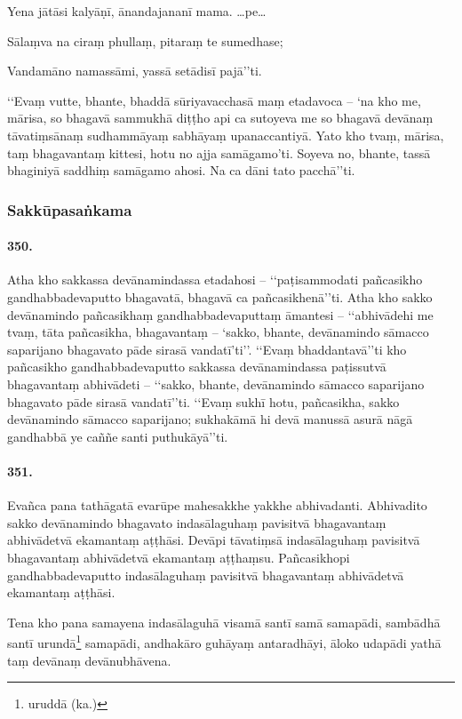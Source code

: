 Yena jātāsi kalyāṇī, ānandajananī mama. …pe…

Sālaṃva na ciraṃ phullaṃ, pitaraṃ te sumedhase;

Vandamāno namassāmi, yassā setādisī pajā’’ti.

‘‘Evaṃ vutte, bhante, bhaddā sūriyavacchasā maṃ etadavoca – ‘na kho me, mārisa, so bhagavā sammukhā diṭṭho api ca sutoyeva me so bhagavā devānaṃ tāvatiṃsānaṃ sudhammāyaṃ sabhāyaṃ upanaccantiyā. Yato kho tvaṃ, mārisa, taṃ bhagavantaṃ kittesi, hotu no ajja samāgamo’ti. Soyeva no, bhante, tassā bhaginiyā saddhiṃ samāgamo ahosi. Na ca dāni tato pacchā’’ti.

\subsubsection{Sakkūpasaṅkama}

\paragraph{350.} Atha kho sakkassa devānamindassa etadahosi – ‘‘paṭisammodati pañcasikho gandhabbadevaputto bhagavatā, bhagavā ca pañcasikhenā’’ti. Atha kho sakko devānamindo pañcasikhaṃ gandhabbadevaputtaṃ āmantesi – ‘‘abhivādehi me tvaṃ, tāta pañcasikha, bhagavantaṃ – ‘sakko, bhante, devānamindo sāmacco saparijano bhagavato pāde sirasā vandatī’ti’’. ‘‘Evaṃ bhaddantavā’’ti kho pañcasikho gandhabbadevaputto sakkassa devānamindassa paṭissutvā bhagavantaṃ abhivādeti – ‘‘sakko, bhante, devānamindo sāmacco saparijano bhagavato pāde sirasā vandatī’’ti. ‘‘Evaṃ sukhī hotu, pañcasikha, sakko devānamindo sāmacco saparijano; sukhakāmā hi devā manussā asurā nāgā gandhabbā ye caññe santi puthukāyā’’ti.

\paragraph{351.} Evañca pana tathāgatā evarūpe mahesakkhe yakkhe abhivadanti. Abhivadito sakko devānamindo bhagavato indasālaguhaṃ pavisitvā bhagavantaṃ abhivādetvā ekamantaṃ aṭṭhāsi. Devāpi tāvatiṃsā indasālaguhaṃ pavisitvā bhagavantaṃ abhivādetvā ekamantaṃ aṭṭhaṃsu. Pañcasikhopi gandhabbadevaputto indasālaguhaṃ pavisitvā bhagavantaṃ abhivādetvā ekamantaṃ aṭṭhāsi.

Tena kho pana samayena indasālaguhā visamā santī samā samapādi, sambādhā santī urundā\footnote{uruddā (ka.)} samapādi, andhakāro guhāyaṃ antaradhāyi, āloko udapādi yathā taṃ devānaṃ devānubhāvena.

